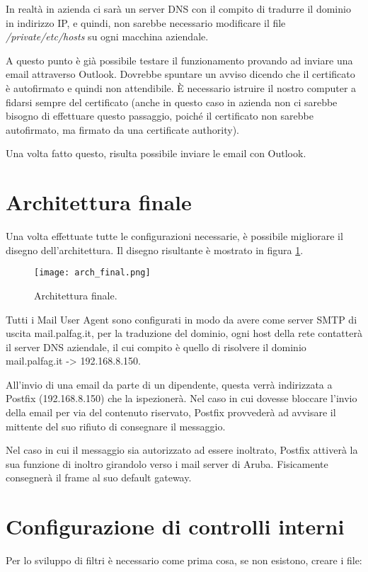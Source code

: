     
    In realtà in azienda ci sarà un server DNS con il compito di tradurre il dominio in indirizzo IP, 
    e quindi, non sarebbe necessario modificare il file \textit{/private/etc/hosts} su ogni macchina aziendale.


    A questo punto è già possibile testare il funzionamento provando ad inviare una email attraverso Outlook. 
    Dovrebbe spuntare un avviso dicendo che il certificato è autofirmato e quindi non attendibile. 
    È necessario istruire il nostro computer a fidarsi sempre del certificato
    (anche in questo caso in azienda non ci sarebbe bisogno di effettuare questo passaggio, poiché 
    il certificato non sarebbe autofirmato, ma firmato da una certificate authority).

    Una volta fatto questo, risulta possibile inviare le email con Outlook.


    \section{Architettura finale}
    Una volta effettuate tutte le configurazioni necessarie, è possibile migliorare il disegno dell’architettura. 
    Il disegno risultante è mostrato in figura \ref{archFinal}.

    \begin{figure}[htp]
        \centering
        \texttt{[image: arch\_final.png]}
        \caption{Architettura finale.}\label{archFinal}
    \end{figure} 

    Tutti i Mail User Agent sono configurati in modo da avere come server SMTP di uscita mail.palfag.it, 
    per la traduzione del dominio, ogni host della rete contatterà il server DNS aziendale, il cui compito è
    quello di risolvere il dominio mail.palfag.it -> 192.168.8.150.

    All'invio di una email da parte di un dipendente, questa verrà indirizzata a Postfix (192.168.8.150) che la 
    ispezionerà. Nel caso in cui dovesse bloccare l’invio della email per via del contenuto riservato, 
    Postfix provvederà ad avvisare il mittente del suo rifiuto di consegnare il messaggio.

    Nel caso in cui il messaggio sia autorizzato ad essere inoltrato, Postfix attiverà la sua funzione di inoltro 
    girandolo verso i mail server di Aruba. Fisicamente consegnerà il frame al suo default gateway.

    \section{Configurazione di controlli interni}
    Per lo sviluppo di filtri è necessario come prima cosa, se non esistono, creare i file:

